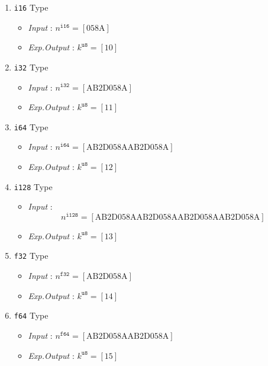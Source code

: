 \documentclass[../alan-handbook.tex]{subfiles}
\begin{document}
\begin{enumerate}
\begin{itemize}
        \end{itemize}
    \item \texttt{i16} Type
        \begin{itemize}
            \item \textit{Input} : $n^{\texttt{i16}} = [\text{058A}]$
            \item \textit{Exp.Output} : $k^{\texttt{u8}} = [\text{10}]$
        \end{itemize}
    \item \texttt{i32} Type
        \begin{itemize}
            \item \textit{Input} : $n^{\texttt{i32}} = [\text{AB2D058A}]$
            \item \textit{Exp.Output} : $k^{\texttt{u8}} = [\text{11}]$
        \end{itemize}
    \item \texttt{i64} Type
        \begin{itemize}
            \item \textit{Input} : $n^{\texttt{i64}} = [\text{AB2D058AAB2D058A}]$
            \item \textit{Exp.Output} : $k^{\texttt{u8}} = [\text{12}]$
        \end{itemize}
    \item \texttt{i128} Type
        \begin{itemize}
            \item \textit{Input} : $$n^{\texttt{i128}} = [\text{AB2D058AAB2D058AAB2D058AAB2D058A}]$$
            \item \textit{Exp.Output} : $k^{\texttt{u8}} = [\text{13}]$
        \end{itemize}
    \item \texttt{f32} Type
        \begin{itemize}
            \item \textit{Input} : $n^{\texttt{f32}} = [\text{AB2D058A}]$
            \item \textit{Exp.Output} : $k^{\texttt{u8}} = [\text{14}]$
        \end{itemize}
    \item \texttt{f64} Type
        \begin{itemize}
            \item \textit{Input} : $n^{\texttt{f64}} = [\text{AB2D058AAB2D058A}]$
            \item \textit{Exp.Output} : $k^{\texttt{u8}} = [\text{15}]$
        \end{itemize}

\end{enumerate}
\end{document}
